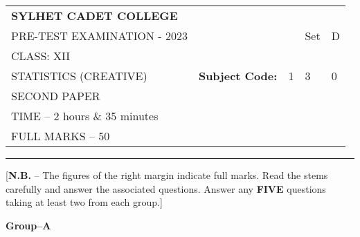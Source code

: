 \documentclass{article}
\begin{document}
\begin{table}[h]
\centering
\begin{tabular}{lllll}
\textbf{\large SYLHET CADET COLLEGE} &  &  &  &  \\ \cline{4-5} 
PRE-TEST EXAMINATION - 2023 &  & \multicolumn{1}{l|}{} & \multicolumn{1}{l|}{Set} & \multicolumn{1}{l|}{D} \\ \cline{4-5} 
CLASS: XII &  &  &  &  \\ \cline{3-5} 
STATISTICS (CREATIVE)& \multicolumn{1}{l|}{\textbf{Subject Code:}} & \multicolumn{1}{l|}{1} & \multicolumn{1}{l|}{3} & \multicolumn{1}{l|}{0} \\ \cline{3-5} 
 SECOND PAPER &  &  &  &  \\
TIME – 2 hours \& 35 minutes &  &  &  &  \\
FULL MARKS – 50 &  &  &  & 
\end{tabular}
\end{table}

\hrule

\begin{center}
[\textbf{N.B.} – The figures of the right margin indicate full marks. Read the stems carefully and answer the associated questions. Answer any \textbf{FIVE} questions taking at least two from each group.]\\

\end{center}

  \begin{center}
  \textbf{Group--A}
  \end{center}
  
\end{document}
